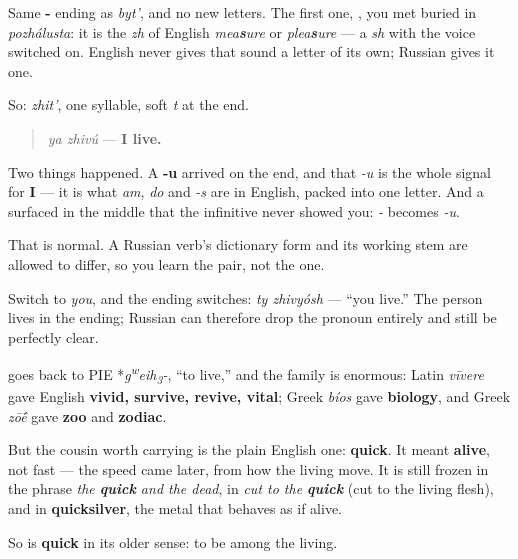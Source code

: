 Same \textbf{-} ending as \emph{byt'}, and no new letters. The first one, \textbf{}, you met buried in \emph{pozhálusta}: it is the \emph{zh} of English \emph{mea\textbf{s}ure} or \emph{plea\textbf{s}ure} — a \emph{sh} with the voice switched on. English never gives that sound a letter of its own; Russian gives it one.

So: \emph{zhit'}, one syllable, soft \emph{t} at the end.

\begin{grammarlens}[title={Grammar Lens: the ending that means \textquotedblleft{}I\textquotedblright{}}]
\begin{quote}
\emph{ya zhivú} — \textbf{I live.}
\end{quote}

Two things happened. A \textbf{-u} arrived on the end, and that \emph{-u} is the whole signal for \textbf{I} — it is what \emph{am}, \emph{do} and \emph{-s} are in English, packed into one letter. And a \textbf{} surfaced in the middle that the infinitive never showed you: \emph{-} becomes \emph{\textbf{}-u}.

That is normal. A Russian verb's dictionary form and its working stem are allowed to differ, so you learn the pair, not the one.

Switch to \emph{you}, and the ending switches: \emph{ty zhivyósh} — \textquotedblleft{}you live.\textquotedblright{} The person lives in the ending; Russian can therefore drop the pronoun entirely and still be perfectly clear.
\end{grammarlens}

\begin{cousinweb}
\textbf{} goes back to PIE *\emph{g\textsuperscript{w}eih\textsubscript{3}-}, \textquotedblleft{}to live,\textquotedblright{} and the family is enormous: Latin \emph{vīvere} gave English \textbf{vivid, survive, revive, vital}; Greek \emph{bíos} gave \textbf{biology}, and Greek \emph{zō\'{\={e}}} gave \textbf{zoo} and \textbf{zodiac}.

But the cousin worth carrying is the plain English one: \textbf{quick}. It meant \textbf{alive}, not fast — the speed came later, from how the living move. It is still frozen in the phrase \emph{the \textbf{quick} and the dead}, in \emph{cut to the \textbf{quick}} (cut to the living flesh), and in \textbf{quicksilver}, the metal that behaves as if alive.

So \emph{} is \textbf{quick} in its older sense: to be among the living.
\end{cousinweb}

